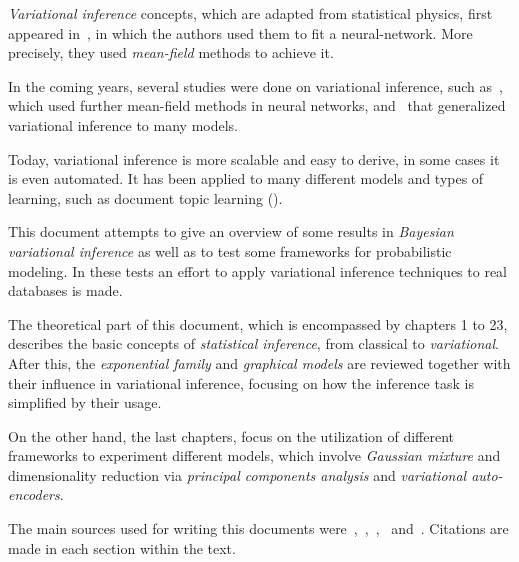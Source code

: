 
\emph{Variational inference} concepts, which are adapted from statistical physics, first appeared in~\cite{anderson1987mean}, in which the authors used them to fit a neural-network. More precisely, they used \emph{mean-field} methods to achieve it.

In the coming years, several studies were done on variational inference, such as~\cite{hinton1993keeping}, which used further mean-field methods in neural networks, and~\cite{jordan1999introduction} that generalized variational inference to many models.

Today, variational inference is more scalable and easy to derive, in some cases it is even automated. It has been applied to many different models and types of learning, such as document topic learning (\cite{blei2012probabilistic}).

This document attempts to give an overview of some results in \emph{Bayesian variational inference} as well as to test some frameworks for probabilistic modeling. In these tests an effort to apply variational inference techniques to real databases is made.

The theoretical part of this document, which is encompassed by chapters 1 to 23, describes the basic concepts of \emph{statistical inference}, from classical to \emph{variational}. After this, the \emph{exponential family} and \emph{graphical models} are reviewed together with their influence in variational inference, focusing on how the inference task is simplified by their usage.

On the other hand, the last chapters, focus on the utilization of different frameworks to experiment different models, which involve \emph{Gaussian mixture} and dimensionality reduction via \emph{principal components analysis} and \emph{variational auto-encoders}.

The main sources used for writing this documents were~\cite{barber},~\cite{bishop2006pattern},~\cite{koller_friedman},~\cite{masegosa2019probabilistic} and~\cite{blei2017variational}. Citations are made in each section within the text.
